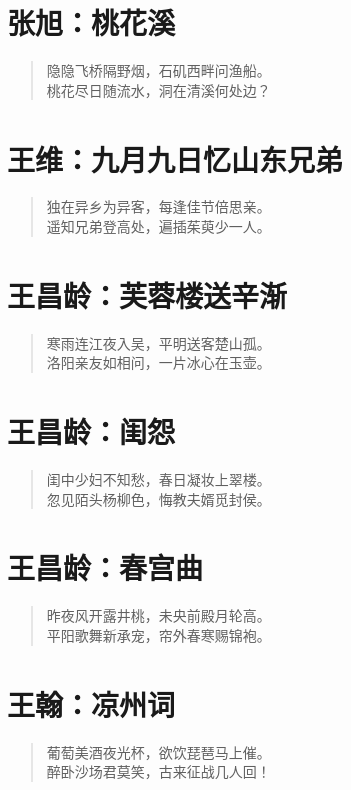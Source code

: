 \documentclass[12pt,oneside]{book}
\newenvironment{shici}{
\begin{verse}
\centering\large\hspace{12pt}}
{\end{verse}}
\begin{document}
\chapter{张旭：桃花溪}
\begin{shici}
隐隐飞桥隔野烟，石矶西畔问渔船。\\
桃花尽日随流水，洞在清溪何处边？
\end{shici}

\chapter{王维：九月九日忆山东兄弟}
\begin{shici}
独在异乡为异客，每逢佳节倍思亲。\\
遥知兄弟登高处，遍插茱萸少一人。
\end{shici}

\chapter{王昌龄：芙蓉楼送辛渐}
\begin{shici}
寒雨连江夜入吴，平明送客楚山孤。\\
洛阳亲友如相问，一片冰心在玉壶。
\end{shici}

\chapter{王昌龄：闺怨}
\begin{shici}
闺中少妇不知愁，春日凝妆上翠楼。\\
忽见陌头杨柳色，悔教夫婿觅封侯。
\end{shici}

\chapter{王昌龄：春宫曲}
\begin{shici}
昨夜风开露井桃，未央前殿月轮高。\\
平阳歌舞新承宠，帘外春寒赐锦袍。
\end{shici}

\chapter{王翰：凉州词}
\begin{shici}
葡萄美酒夜光杯，欲饮琵琶马上催。\\
醉卧沙场君莫笑，古来征战几人回！
\end{shici}
\end{document}
